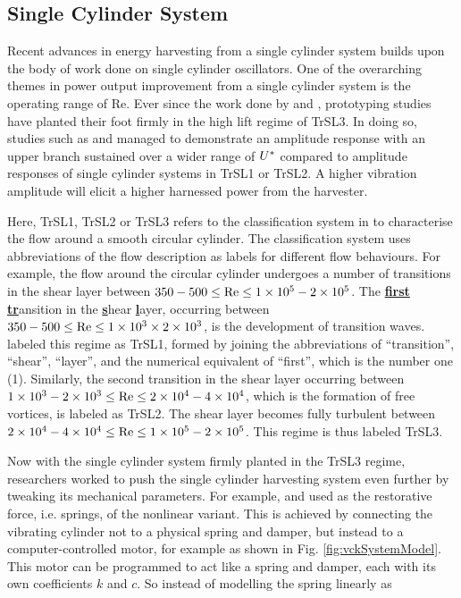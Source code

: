 \documentclass[oneside]{utmthesis}
\begin{document}
\subsection{Single Cylinder System} \label{ssec:singleCylinderHarvester}
Recent advances in energy harvesting from a single cylinder system builds upon the body of work done on single cylinder oscillators. One of the overarching themes in power output improvement from a single cylinder system is the operating range of Re. Ever since the work done by \citet{Bernitsas2008a} and \citet{Bernitsas2009}, prototyping studies have planted their foot firmly in the high lift regime of TrSL3. In doing so, studies such as \citet{Ding2019} and \citet{Park2017} managed to demonstrate an amplitude response with an upper branch sustained over a wider range of $U^{*}$ compared to amplitude responses of single cylinder systems in TrSL1 or TrSL2. A higher vibration amplitude will elicit a higher harnessed power from the harvester.

Here, TrSL1, TrSL2 or TrSL3 refers to the classification system in \citet{Zdravkovich1997} to characterise the flow around a smooth circular cylinder. The classification system uses abbreviations of the flow description as labels for different flow behaviours. For example, the flow around the circular cylinder undergoes a number of transitions in the shear layer between $350 - 500 \leq \text{Re} \leq 1 \times 10^{5} - 2 \times 10^{5}$. The \underline{\textbf{first}} \underline{\textbf{tr}}ansition in the \underline{\textbf{s}}hear \underline{\textbf{l}}ayer, occurring between $350 - 500 \leq \text{Re} \leq 1 \times 10^{3} \times 2 \times 10^{3}$, is the development of transition waves. \citet{Zdravkovich1997} labeled this regime as TrSL1, formed by joining the abbreviations of ``transition'', ``shear'', ``layer'', and the numerical equivalent of ``first'', which is the number one (1). Similarly, the second transition in the shear layer occurring between $1 \times 10^{3} - 2 \times 10^{3} \leq \text{Re} \leq 2 \times 10^{4} - 4 \times 10^{4}$, which is the formation of free vortices, is labeled as TrSL2. The shear layer becomes fully turbulent between $2 \times 10^{4} - 4 \times 10^{4} \leq \text{Re} \leq 1 \times 10^{5} - 2 \times 10^{5}$. This regime is thus labeled TrSL3. 

Now with the single cylinder system firmly planted in the TrSL3 regime, researchers worked to push the single cylinder harvesting system even further by tweaking its mechanical parameters. For example, \citet{Sun2018} and \citet{Ma2018} used as the restorative force, i.e. springs, of the nonlinear variant. This is achieved by connecting the vibrating cylinder not to a physical spring and damper, but instead to a computer-controlled motor, for example as shown in Fig. \ref{fig:vckSystemModel}. This motor can be programmed to act like a spring and damper, each with its own coefficients $k$ and $c$. So instead of modelling the spring linearly as
\end{document}
